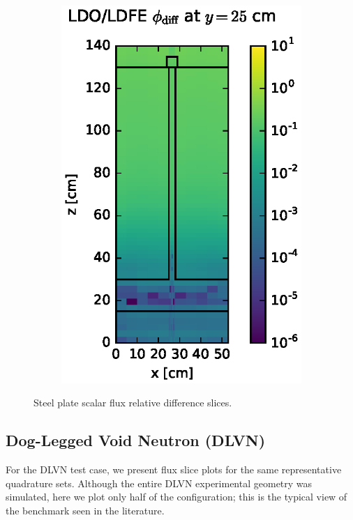 \documentclass{article} %
\begin{document}
\begin{figure}[!htb]
\begin{subfigure}{0.4\textwidth}
\includegraphics[max height=0.445\textheight]
{img/steel-flux-diff-ldfe.eps}
\end{subfigure}
\caption{Steel plate  scalar flux relative difference slices.}
\label{steel-fwd-diff-rel}
\end{figure}

\FloatBarrier
\subsection{Dog-Legged Void Neutron (DLVN)}

For the DLVN test case, we present flux slice plots for the same representative
quadrature sets. Although the entire DLVN
experimental geometry was simulated, here we plot only half of the
configuration; this is the typical view of the benchmark seen in the
literature.
\end{document}
